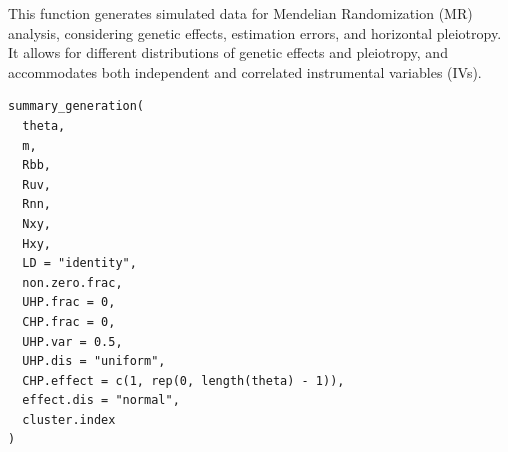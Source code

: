 \documentclass[a4paper]{book}
\begin{document}
%
\begin{Description}
This function generates simulated data for Mendelian Randomization (MR) analysis,
considering genetic effects, estimation errors, and horizontal pleiotropy.
It allows for different distributions of genetic effects and pleiotropy,
and accommodates both independent and correlated instrumental variables (IVs).
\end{Description}
%
\begin{Usage}
\begin{verbatim}
summary_generation(
  theta,
  m,
  Rbb,
  Ruv,
  Rnn,
  Nxy,
  Hxy,
  LD = "identity",
  non.zero.frac,
  UHP.frac = 0,
  CHP.frac = 0,
  UHP.var = 0.5,
  UHP.dis = "uniform",
  CHP.effect = c(1, rep(0, length(theta) - 1)),
  effect.dis = "normal",
  cluster.index
)
\end{verbatim}
\end{Usage}
%
\end{document}
